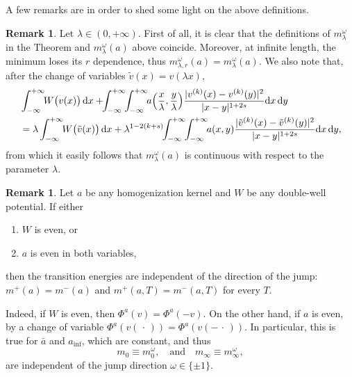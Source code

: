 \documentclass{article}
\theoremstyle{definition}
\newtheorem{Remark}[Theorem]{Remark}
\newcommand{\de}{\mathrm{d}}
\begin{document}
A few remarks are in order to shed some light on the above definitions.
\begin{Remark}\label{rmk:lambda_continuity} Let $\lambda\in (0,+\infty)$. First of all, it is clear that the definitions of $m^{\omega}_\lambda$ in the Theorem and $m^\omega_\lambda(a)$ above coincide. Moreover, at infinite length, the minimum loses its $r$ dependence, thus $m^{\omega}_{\lambda,r}(a)=m^{\omega}_\lambda(a).$
We also note that, after the change of variables $\tilde v(x)=v(\lambda x)$,
\begin{equation*}
    \begin{split}
        &\int_{-\infty}^{+\infty}\mkern-6mu W\big(v(x)\big)\,\de x +\mkern-6mu   \int_{-\infty}^{+\infty}\mkern-6mu \int_{-\infty}^{+\infty}\mkern-6mu a\Big(\frac{x}{\lambda},\frac{y}{\lambda} \Big) \frac{|v^{(k)}(x)-v^{(k)}(y)|^2}{|x-y|^{1+2s}}\de x\,\de y\\
        &=\lambda\int_{-\infty}^{+\infty}\mkern-6mu W\big(\tilde v(x)\big)\,\de x +  \lambda^{1-2(k+s)}\mkern-6mu \int_{-\infty}^{+\infty}\mkern-6mu \int_{-\infty}^{+\infty}\mkern-6mu  a(x,y) \frac{|{\tilde v}^{(k)}(x)-{\tilde v}^{(k)}(y)|^2}{|x-y|^{1+2s}}\de x\,\de y,\\
    \end{split}
\end{equation*}
from which it easily follows that $m^{\omega}_\lambda(a)$ is continuous with respect to the parameter $\lambda$.       
\end{Remark}

 \begin{Remark}
 \label{transition asymmetry} Let $a$ be any homogenization kernel and $W$ be any double-well potential. If either
 \begin{enumerate}
     \item $W$ is even, or
     \item $a$ is even in both variables,
 \end{enumerate}
 then the transition energies are independent of the direction of the jump:   $m^+(a)=m^-(a)$ and $m^+(a, T)=m^-(a, T)$ for every $T$.
 
Indeed, if $W$ is even, then $\Phi^{a}(v) = \Phi^{a}(-v)$. On the other hand, if $a$ is even, by a change of variable $\Phi^{a}(v(\,\cdot\,)) = \Phi^{a}(v(-\,\cdot\,))$. In particular, this is true for $\bar a$ and $a_{\inf}$, which are constant, and thus 
\[m_0\equiv m^\omega_0,\quad \text{and}\quad m_\infty\equiv m^\omega_\infty,\] are independent of the jump direction $\omega\in \{\pm 1\}$.
 \end{Remark}
\end{document}
